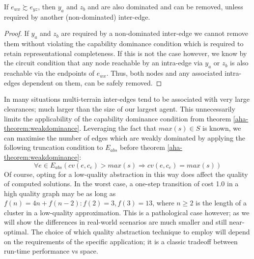 \begin{corollary}
If $e_{wx} \succsim e_{yz}$, then $y_{a}$ and $z_{b}$ and are also dominated and can be removed, unless required by another (non-dominated) inter-edge. 
\end{corollary}
\begin{proof}
If $y_{a}$ and $z_{b}$ are required by a non-dominated inter-edge we cannot remove them without violating the capability dominance condition which is required to retain representational completeness. 
If this is not the case however, we know by the circuit condition that any node reachable by an intra-edge via $y_{a}$ or $z_{b}$ is also reachable via the endpoints of $e_{wx}$. 
Thus, both nodes and any associated intra-edges dependent on them, can be safely removed.
\end{proof}
In many situations multi-terrain inter-edges tend to be associated with very large clearances; much larger than the size of our largest agent.
This unnecessarily limits the applicability of the capability dominance condition from theorem \ref{aha-theorem:weakdominance}. 
Leveraging the fact that $max(s) \in S$ is known, we can maximise the number of edges which are weakly dominated by applying the following truncation condition to $E_{abs}$ before theorem \ref{aha-theorem:weakdominance}:
$$
\forall e \in E_{abs} (cv(e, c_{e}) > max(s) \Rightarrow cv(e, c_{e}) = max(s)) 
$$
Of course, opting for a low-quality abstraction in this way does affect the quality of computed solutions. 
In the worst case, a one-step transition of cost 1.0 in a high quality graph may be as long as $f(n) = 4n + f(n-2) : f(2) = 3, f(3) = 13$, where $n \geq 2$ is the length of a cluster in a low-quality approximation.
This is a pathological case however; as we will show the differences in real-world scenarios are much smaller and still near-optimal. 
The choice of which quality abstraction technique to employ will depend on the requirements of the specific application; it is a classic tradeoff between run-time performance vs space.
